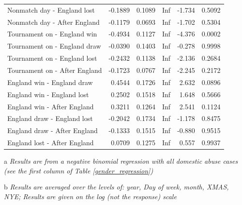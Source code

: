 \documentclass[12pt, letterpaper]{article}
\begin{document}
\begin{table}[ht]
{\begin{threeparttable}
\begin{tabular}{lrrrrl}
  Nonmatch day - England lost & -0.1889 & 0.1089 & Inf & -1.734 & 0.5092 \\ 
  Nonmatch day - After England & -0.1179 & 0.0693 & Inf & -1.702 & 0.5304 \\ 
  Tournament on - England win & -0.4934 & 0.1127 & Inf & -4.376 & 0.0002 \\ 
  Tournament on - England draw & -0.0390 & 0.1403 & Inf & -0.278 & 0.9998 \\ 
  Tournament on - England lost & -0.2432 & 0.1138 & Inf & -2.136 & 0.2684 \\ 
  Tournament on - After England & -0.1723 & 0.0767 & Inf & -2.245 & 0.2172 \\ 
  England win - England draw & 0.4544 & 0.1726 & Inf & 2.632 & 0.0896 \\ 
  England win - England lost & 0.2502 & 0.1518 & Inf & 1.648 & 0.5666 \\ 
  England win - After England & 0.3211 & 0.1264 & Inf & 2.541 & 0.1124 \\ 
  England draw - England lost & -0.2042 & 0.1734 & Inf & -1.178 & 0.8475 \\ 
  England draw - After England & -0.1333 & 0.1515 & Inf & -0.880 & 0.9515 \\ 
  England lost - After England & 0.0709 & 0.1275 & Inf & 0.557 & 0.9937 \\ 
   \hline
   
   


\end{tabular}
\begin{tablenotes}
      \item[a] \textit{Results are from a negative binomial regression with all domestic abuse cases (see the first column of Table \ref{gender_regression})}
      \item[b] \textit{Results are averaged over the levels of: year, Day of week, month, XMAS, NYE;  Results are given on the log (not the response) scale}
    \end{tablenotes}
\end{threeparttable} }
\end{table}
\end{document}
